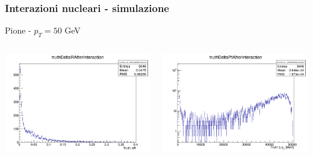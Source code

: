 \documentclass{beamer}
\begin{document}
\begin{frame}
\frametitle{Interazioni nucleari - simulazione}
Pione - $p_{T} = 50$ GeV
\bigskip
\centering
\begin{columns}
\begin{column}{.5\textwidth}
\includegraphics[width=\textwidth]{Tracking/pi50pu0_truthDeltaRAfterInteraction}
\end{column}
\begin{column}{.5\textwidth}
\includegraphics[width=\textwidth]{Tracking/pi50pu0_truthDeltaPtAfterInteraction}
\end{column}
\end{columns}
\end{frame}
\end{document}
